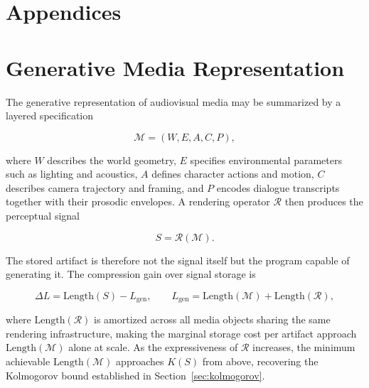 \documentclass[12pt,a4paper]{article}
\theoremstyle{plain}
\theoremstyle{definition}
\begin{document}

\newpage

\section*{Appendices}

\appendix

\section{Generative Media Representation}
\label{app:generative}

The generative representation of audiovisual media may be summarized by a layered specification

\begin{equation}
\mathcal{M} = (W, E, A, C, P),
\end{equation}

where $W$ describes the world geometry, $E$ specifies environmental parameters such as lighting and acoustics, $A$ defines character actions and motion, $C$ describes camera trajectory and framing, and $P$ encodes dialogue transcripts together with their prosodic envelopes. A rendering operator $\mathcal{R}$ then produces the perceptual signal

\begin{equation}
S = \mathcal{R}(\mathcal{M}).
\end{equation}

The stored artifact is therefore not the signal itself but the program capable of generating it. The compression gain over signal storage is

\begin{equation}
\Delta L = \text{Length}(S) - L_{\text{gen}},
\qquad
L_{\text{gen}} = \text{Length}(\mathcal{M}) + \text{Length}(\mathcal{R}),
\end{equation}

where $\text{Length}(\mathcal{R})$ is amortized across all media objects sharing the same rendering infrastructure, making the marginal storage cost per artifact approach $\text{Length}(\mathcal{M})$ alone at scale. As the expressiveness of $\mathcal{R}$ increases, the minimum achievable $\text{Length}(\mathcal{M})$ approaches $K(S)$ from above, recovering the Kolmogorov bound established in Section~\ref{sec:kolmogorov}.

\end{document}

